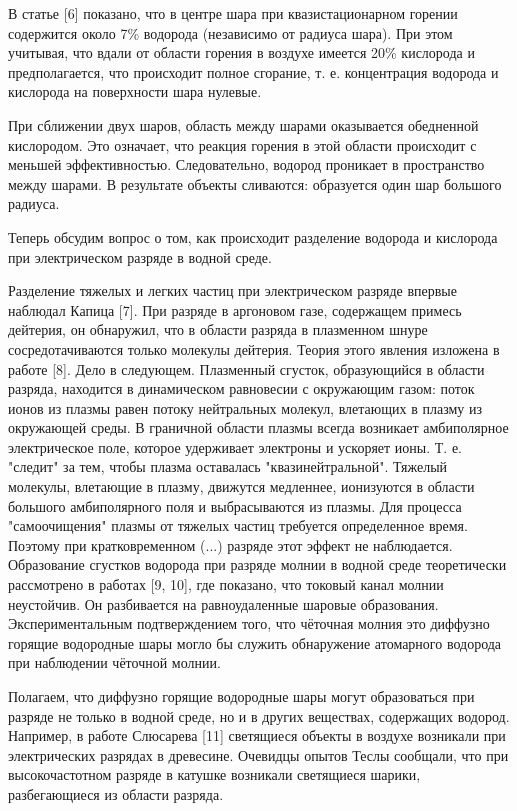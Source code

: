 \documentclass[a4paper]{article}
\begin{document}
В статье [6] показано, что в центре шара при квазистационарном горении содержится около 7\% водорода (независимо от радиуса шара). При этом учитывая, что вдали от области горения в воздухе имеется 20\% кислорода и предполагается, что происходит полное сгорание, т. е. концентрация водорода и кислорода на поверхности шара нулевые.

При сближении двух шаров, область между шарами оказывается обедненной кислородом. Это означает, что реакция горения в этой области происходит с меньшей эффективностью. Следовательно, водород проникает в пространство между шарами. В результате объекты сливаются: образуется один шар большого радиуса.


Теперь обсудим вопрос о том, как происходит разделение водорода и кислорода при электрическом разряде в водной среде.

Разделение тяжелых и легких частиц при электрическом разряде впервые наблюдал Капица [7]. При разряде в аргоновом газе, содержащем примесь дейтерия, он обнаружил, что в области разряда в плазменном шнуре сосредотачиваются только молекулы дейтерия. Теория этого явления изложена в работе [8]. Дело в следующем. Плазменный сгусток, образующийся в области разряда, находится в динамическом равновесии с окружающим газом: поток ионов из плазмы равен потоку нейтральных молекул, влетающих в плазму из окружающей среды. В граничной области плазмы всегда возникает амбиполярное электрическое поле, которое удерживает электроны и ускоряет ионы. Т. е. "следит" за тем, чтобы плазма оставалась "квазинейтральной". Тяжелый молекулы, влетающие в плазму, движутся медленнее, ионизуются в области большого амбиполярного поля и выбрасываются из плазмы. Для процесса "самоочищения" плазмы от тяжелых частиц требуется определенное время. Поэтому при кратковременном (...) разряде этот эффект не наблюдается. Образование сгустков водорода при разряде молнии в водной среде теоретически рассмотрено в работах [9, 10], где показано, что токовый канал молнии неустойчив. Он разбивается на равноудаленные шаровые образования. Экспериментальным подтверждением того, что чёточная молния это диффузно горящие водородные шары могло бы служить обнаружение атомарного водорода при наблюдении чёточной молнии.

Полагаем, что диффузно горящие водородные шары могут образоваться при разряде не только в водной среде, но и в других веществах, содержащих водород. Например, в работе Слюсарева [11] светящиеся объекты в воздухе возникали при электрических разрядах в древесине. Очевидцы опытов Теслы сообщали, что при высокочастотном разряде в катушке возникали светящиеся шарики, разбегающиеся из области разряда.
\end{document}
